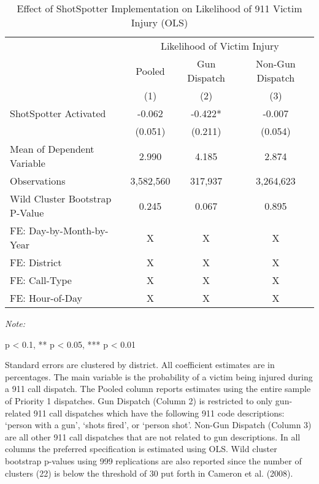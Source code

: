 \begin{table}[H]

\caption{\label{victim_table}Effect of ShotSpotter Implementation on Likelihood of 911 Victim Injury (OLS)}
\centering
\begin{threeparttable}
\fontsize{11}{13}\selectfont
\begin{tabular}[t]{>{\raggedright\arraybackslash}p{8cm}ccc}
\toprule
\multicolumn{1}{c}{ } & \multicolumn{3}{c}{Likelihood of Victim Injury} \\
\cmidrule(l{3pt}r{3pt}){2-4}
\multicolumn{1}{c}{ } & \multicolumn{1}{c}{Pooled} & \multicolumn{1}{c}{Gun Dispatch} & \multicolumn{1}{c}{Non-Gun Dispatch} \\
\cmidrule(l{3pt}r{3pt}){2-2} \cmidrule(l{3pt}r{3pt}){3-3} \cmidrule(l{3pt}r{3pt}){4-4}
  & (1) & (2) & (3)\\
\midrule
ShotSpotter Activated & -0.062 & -0.422* & -0.007\\
 & (0.051) & (0.211) & (0.054)\\
Mean of Dependent Variable & 2.990 & 4.185 & 2.874\\
Observations & 3,582,560 & 317,937 & 3,264,623\\
Wild Cluster Bootstrap P-Value & 0.245 & 0.067 & 0.895\\
\midrule
\addlinespace
FE: Day-by-Month-by-Year & X & X & X\\
FE: District & X & X & X\\
FE: Call-Type & X & X & X\\
FE: Hour-of-Day & X & X & X\\
\bottomrule
\end{tabular}
\begin{tablenotes}
\item \textit{Note: } 
\item * p < 0.1, ** p < 0.05, *** p < 0.01
\item Standard errors are clustered by district. All coefficient                      estimates are in percentages.                      The main variable is the probability of a victim being                      injured during a 911 call dispatch.                      The Pooled column reports estimates using the entire sample of Priority 1                      dispatches.                      Gun Dispatch (Column 2) is restricted to only gun-related 911 call dispatches which                      have the following 911 code descriptions:                      `person with a gun',                  `shots fired', or `person shot'. Non-Gun Dispatch (Column 3) are all other                      911 call dispatches that are not related to gun descriptions. In all columns the preferred specification is estimated using                      OLS. Wild cluster bootstrap p-values using 999 replications are also reported                  since the number of clusters (22) is below the threshold of 30 put forth in                  Cameron et al. (2008).                                    
\end{tablenotes}
\end{threeparttable}
\end{table}
